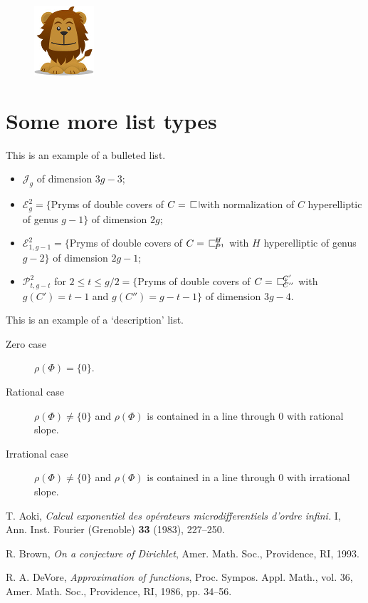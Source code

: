 \documentclass{amsart}
\theoremstyle{definition}
\theoremstyle{remark}
\numberwithin{equation}{section}
\newcommand{\blankbox}[2]{%
  \parbox{\columnwidth}{\centering
    \setlength{\fboxsep}{0pt}%
    \fbox{\raisebox{0pt}[#2]{\hspace{#1}}}%
  }%
}
\begin{document}
\begin{figure}[tb]
\includegraphics{lion.png}
\caption{}\label{otherfig}
\end{figure}

\section{Some more list types}
This is an example of a bulleted list.

\begin{itemize}
\item $\mathcal{J}_g$ of dimension $3g-3$;
\item $\mathcal{E}^2_g=\{$Pryms of double covers of $C=\openbox$ with
normalization of $C$ hyperelliptic of genus $g-1\}$ of dimension $2g$;
\item $\mathcal{E}^2_{1,g-1}=\{$Pryms of double covers of
$C=\openbox^H_{P^1}$ with $H$ hyperelliptic of genus $g-2\}$ of
dimension $2g-1$;
\item $\mathcal{P}^2_{t,g-t}$ for $2\le t\le g/2=\{$Pryms of double
covers of $C=\openbox^{C'}_{C''}$ with $g(C')=t-1$ and $g(C'')=g-t-1\}$
of dimension $3g-4$.
\end{itemize}

This is an example of a `description' list.

\begin{description}
\item[Zero case] $\rho(\Phi) = \{0\}$.

\item[Rational case] $\rho(\Phi) \ne \{0\}$ and $\rho(\Phi)$ is
contained in a line through $0$ with rational slope.

\item[Irrational case] $\rho(\Phi) \ne \{0\}$ and $\rho(\Phi)$ is
contained in a line through $0$ with irrational slope.
\end{description}


\begin{thebibliography}{10}

 T. Aoki, \textit{Calcul exponentiel des op\'erateurs
microdifferentiels d'ordre infini.} I, Ann. Inst. Fourier (Grenoble)
\textbf{33} (1983), 227--250.

 R. Brown, \textit{On a conjecture of Dirichlet},
Amer. Math. Soc., Providence, RI, 1993.

 R. A. DeVore, \textit{Approximation of functions},
Proc. Sympos. Appl. Math., vol. 36,
Amer. Math. Soc., Providence, RI, 1986, pp. 34--56.

\end{thebibliography}
\end{document}
